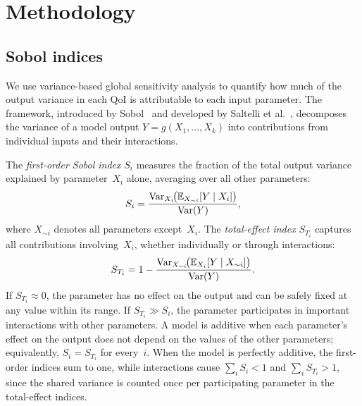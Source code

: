 \section{Methodology}
\label{sec:sa-methodology}

\subsection{Sobol indices}
\label{sec:sa-sobol-method}

We use variance-based global sensitivity analysis to quantify how much of the output variance in each QoI is attributable to each input parameter. The framework, introduced by Sobol~\cite{sobol2001} and developed by Saltelli et al.~\cite{saltelli2008}, decomposes the variance of a model output $Y = g(X_1, \ldots, X_k)$ into contributions from individual inputs and their interactions.

The \emph{first-order Sobol index} $S_i$ measures the fraction of the total output variance explained by parameter~$X_i$ alone, averaging over all other parameters:
\begin{equation}
  \label{eq:sobol-first}
  S_i = \frac{\operatorname{Var}_{X_i}\!\bigl(\mathbb{E}_{X_{\sim i}}[Y \mid X_i]\bigr)}{\operatorname{Var}(Y)},
\end{equation}
where $X_{\sim i}$ denotes all parameters except~$X_i$. The \emph{total-effect index} $S_{T_i}$ captures all contributions involving~$X_i$, whether individually or through interactions:
\begin{equation}
  \label{eq:sobol-total}
  S_{T_i} = 1 - \frac{\operatorname{Var}_{X_{\sim i}}\!\bigl(\mathbb{E}_{X_i}[Y \mid X_{\sim i}]\bigr)}{\operatorname{Var}(Y)}.
\end{equation}
If $S_{T_i} \approx 0$, the parameter has no effect on the output and can be safely fixed at any value within its range. If $S_{T_i} \gg S_i$, the parameter participates in important interactions with other parameters. A model is additive when each parameter's effect on the output does not depend on the values of the other parameters; equivalently, $S_i = S_{T_i}$ for every~$i$. When the model is perfectly additive, the first-order indices sum to one, while interactions cause $\sum_i S_i < 1$ and $\sum_i S_{T_i} > 1$, since the shared variance is counted once per participating parameter in the total-effect indices.

